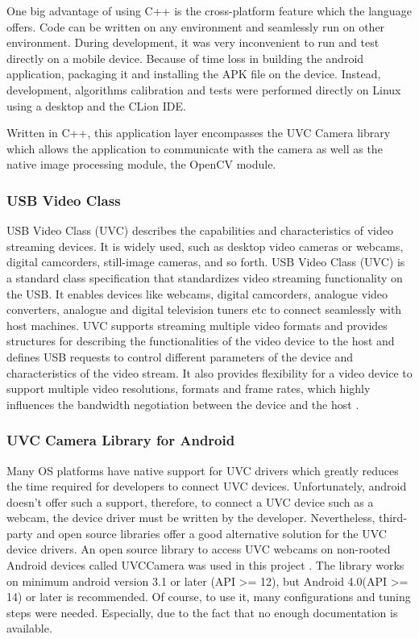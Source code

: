 One big advantage of using C++ is the cross-platform feature which the language offers. Code can be written on any environment and seamlessly run on other environment. During development, it was very inconvenient to run and test directly on a mobile device. Because of time loss in building the android application, packaging it and installing the APK file on the device. Instead, development, algorithms calibration and tests were performed directly on Linux using a desktop and the CLion IDE.

Written in C++, this application layer encompasses the UVC Camera library which allows the application to communicate with the camera as well as the native image processing module, the OpenCV module.



\subsubsection{USB Video Class}

USB Video Class (UVC) describes the capabilities and characteristics of video streaming devices. It is widely used, such as desktop video cameras or webcams, digital camcorders, still-image cameras, and so forth. USB Video Class (UVC) is a standard class specification that standardizes video streaming functionality on the USB. It enables devices like webcams, digital camcorders, analogue video converters, analogue and digital television tuners etc to connect seamlessly with host machines. UVC supports streaming multiple video formats and provides structures for describing the functionalities of the video device to the host and defines USB requests to control different parameters of the device and characteristics of the video stream. It also provides flexibility for a video device to support multiple video resolutions, formats and frame rates, which highly influences the bandwidth negotiation between the device and the host \parencite{uvc}.

\subsubsection{UVC Camera Library for Android}
Many OS platforms have native support for UVC drivers which greatly reduces the time required for developers to connect UVC devices. Unfortunately, android doesn’t offer such a support, therefore, to connect a UVC device such as a webcam, the device driver must be written by the developer. 
Nevertheless, third-party and open source libraries offer a good alternative solution for the UVC device drivers. An open source library to access UVC webcams on non-rooted Android devices called UVCCamera was used in this project \parencite{uvcCamera}. The library works on minimum android version 3.1 or later (API >= 12), but Android 4.0(API >= 14) or later is recommended. Of course, to use it, many configurations and tuning steps were needed. Especially, due to the fact that no enough documentation is available.



